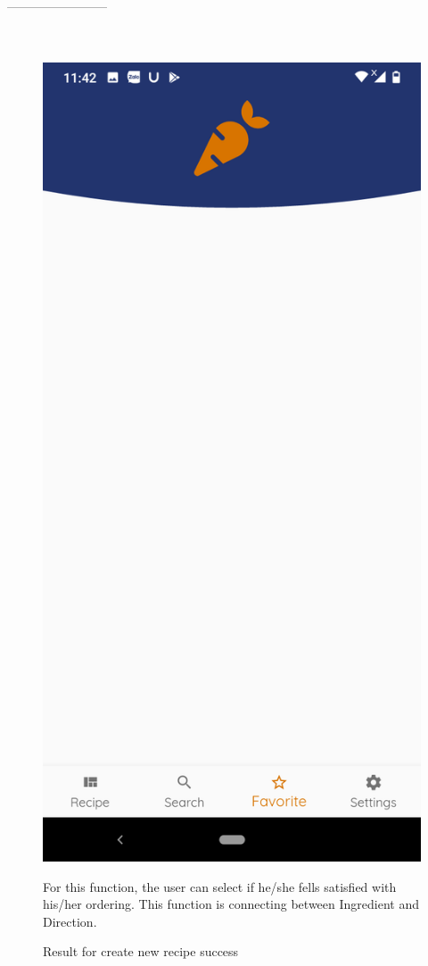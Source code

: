 \documentclass{article}
\begin{document}
         ------------------------\\ \\ \\
    \begin{figure}[h!]
    \centering
    \includegraphics[scale=0.1]{Images/Favorite.jpg}
    \caption{Result for create new recipe success}
    For this function, the user can select if he/she fells satisfied with his/her ordering. This function is connecting between Ingredient and Direction. 
    \label{fig:cookingbook}
    \end{figure}
\end{document}
